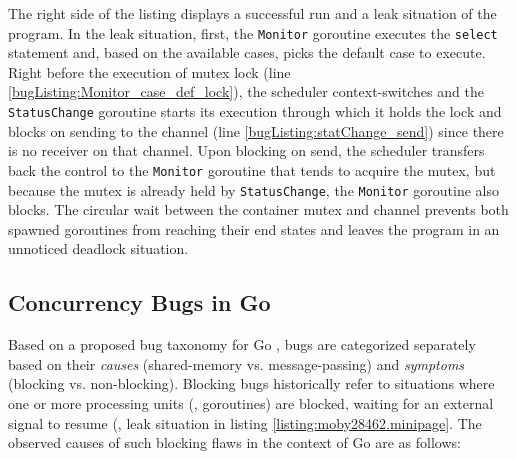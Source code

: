 %
The right side of the listing displays a successful run and a leak situation of the program.
%
In the leak situation, first, the \texttt{Monitor} goroutine executes the \texttt{select} statement and, based on the available cases, picks the default case to execute.
%
Right before the execution of mutex lock (line \ref{bugListing:Monitor_case_def_lock}), the scheduler context-switches and the \texttt{StatusChange} goroutine starts its execution through which it holds the lock and blocks on sending to the channel (line \ref{bugListing:statChange_send}) since there is no receiver on that channel.
%
Upon blocking on send, the scheduler transfers back the control to the \texttt{Monitor} goroutine that tends to acquire the mutex, but because the mutex is already held by \texttt{StatusChange}, the \texttt{Monitor} goroutine also blocks.
%
The circular wait between the container mutex and channel prevents both spawned goroutines from reaching their end states and leaves the program in an unnoticed deadlock situation.
%
%
%
%


\subsection{Concurrency Bugs in Go}
\label{sec:goBugs}
Based on a proposed bug taxonomy for Go \cite{tu-concurrentBugs-asplos19}, bugs are categorized separately based on their \textit{causes} (shared-memory vs. message-passing) and \textit{symptoms} (blocking vs. non-blocking).
%
Blocking bugs historically refer to situations where one or more processing units (\eg, goroutines) are blocked, waiting for an external signal to resume (\eg, leak situation in listing \ref{listing:moby28462.minipage}.
%
The observed causes of such blocking flaws in the context of Go are as follows:

